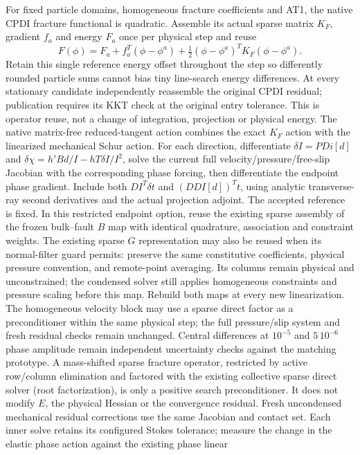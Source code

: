 \documentclass[11pt]{article}
\begin{document}
For fixed particle domains, homogeneous fracture coefficients and AT1, the
native CPDI fracture functional is quadratic. Assemble its actual sparse
matrix $K_F$, gradient $f_a$ and energy $F_a$ once per physical step and reuse
\[
 F(\phi)=F_a+f_a^T(\phi-\phi^a)
       +\tfrac12(\phi-\phi^a)^TK_F(\phi-\phi^a).
\]
Retain this single reference energy offset throughout the step so differently
rounded particle sums cannot bias tiny line-search energy differences. At every
stationary candidate independently reassemble the original CPDI residual;
publication requires its KKT check at the original entry tolerance. This is
operator reuse, not a change of integration, projection or physical energy.
The native matrix-free reduced-tangent action combines the exact $K_F$ action
with the linearized mechanical Schur action. For each direction, differentiate
$\delta I=P D i[d]$ and $\delta\chi=h' B d/I-h T\delta I/I^2$, solve the
current full velocity/pressure/free-slip Jacobian with the corresponding phase
forcing, then differentiate the endpoint phase gradient. Include both
$DI^T\delta t$ and $(D DI[d])^Tt$, using analytic transverse-ray second
derivatives and the actual projection adjoint. The accepted reference is fixed.
In this restricted endpoint option, reuse the existing sparse assembly of the
frozen bulk--fault $B$ map with identical quadrature, association and constraint
weights. The existing sparse $G$ representation may also be reused when its
normal-filter guard permits: preserve the same constitutive coefficients,
physical pressure convention, and remote-point averaging. Its columns remain
physical and unconstrained; the condensed solver still applies homogeneous
constraints and pressure scaling before this map. Rebuild both maps at every
new linearization. The homogeneous velocity block
may use a sparse direct factor as a preconditioner within the same physical
step; the full pressure/slip system and fresh residual checks remain unchanged.
Central differences at $10^{-5}$ and $5\,10^{-6}$ phase amplitude remain
independent uncertainty checks against the matching prototype. A mass-shifted
sparse fracture operator, restricted by active row/column elimination and
factored with the existing collective sparse direct solver (root factorization),
is only a positive search preconditioner. It does
not modify $E$, the physical Hessian or the convergence residual. Fresh uncondensed mechanical residual corrections use the same Jacobian and
contact set. Each inner solve retains its configured Stokes tolerance; measure
the change in the elastic phase action against the existing phase linear
\end{document}
